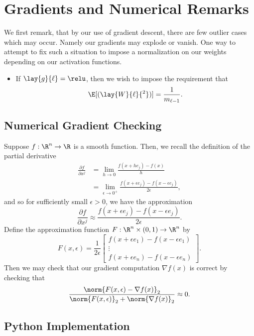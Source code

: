 

\section{Gradients and Numerical Remarks}

We first remark, that by our use of gradient descent, there are few outlier cases which may occur.  Namely our gradients may explode or vanish.  One way to attempt to fix such a situation to impose a normalization on our weights depending on our activation functions.
\begin{itemize}
	\item If $\lay{g}{\ell}=\relu$, then we wish to impose the requirement that
		$$\E[(\lay{W}{\ell}{^2})]=\frac{1}{m_{\ell-1}}.$$
\end{itemize}


\subsection{Numerical Gradient Checking}

Suppose $f:\R^n\to\R$ is a smooth function.  Then, we recall the definition of the partial derivative
\begin{align*}
	\frac{\partial f}{\partial x^j}&=\lim_{h\to0}\frac{f(x+he_j)-f(x)}{h}\\
	&=\lim_{\epsilon\to0^+}\frac{f(x+\epsilon e_j)-f(x-\epsilon e_j)}{2\epsilon},
\end{align*}
and so for sufficiently small $\epsilon>0$, we have the approximation
$$\frac{\partial f}{\partial x^j}\approx \frac{f(x+\epsilon e_j)-f(x-\epsilon e_j)}{2\epsilon}.$$
Define the approximation function $F:\R^n\times (0,1)\to\R^n$ by
$$F(x,\epsilon)=\frac{1}{2\epsilon}\begin{bmatrix}
	f(x+\epsilon e_1)-f(x-\epsilon e_1)\\
	\vdots\\
	f(x+\epsilon e_n)-f(x-\epsilon e_n)
\end{bmatrix}.$$
Then we may check that our gradient computation $\nabla f(x)$ is correct by checking that
$$\frac{\norm{F(x,\epsilon)-\nabla f(x)}_2}{\norm{F(x,\epsilon)}_2+\norm{\nabla f(x)}_2}\approx 0.$$

\subsection{Python Implementation}




